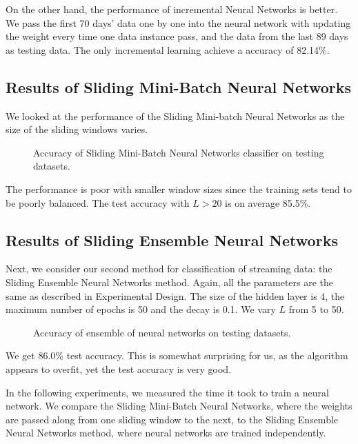 \documentclass[conference]{IEEEtran}
\begin{document}
		On the other hand, the performance of incremental Neural Networks is better. We pass the first 70 days' data one by one into the neural network with updating the weight every time one data instance pass, and the data from the last 89 days as testing data. The only incremental learning achieve a accuracy of 82.14\%.
		
		\subsection{Results of Sliding Mini-Batch Neural Networks}
		
		We looked at the performance of the Sliding Mini-batch Neural Networks as the size of the sliding windows varies.
		\begin{figure}[H]
			\centering
			\caption{Accuracy of Sliding Mini-Batch Neural Networks classifier on testing datasets.}
			\label{fig:benchmark}
		\end{figure}
		The performance is poor with smaller window sizes since the training sets tend to be poorly balanced. The test accuracy with $L > 20$ is on average 85.5\%.
		
		
		\subsection{Results of Sliding Ensemble Neural Networks}
		
		Next, we consider our second method for classification of streaming data: the Sliding Ensemble Neural Networks method.
		Again, all the parameters are the same as described in Experimental Design. The size of the hidden layer is 4, the maximum number of epochs is 50 and the decay is 0.1. We vary $L$ from 5 to 50.
		
		\begin{figure}[H]
			\centering
			\caption{Accuracy of ensemble of neural networks on  testing datasets.}
			\label{fig:results-nnet-ensemble}
		\end{figure}
		
		We get 86.0\% test accuracy. This is somewhat surprising for us, as the algorithm appears to overfit, yet the test accuracy is very good.
		
		In the following experiments, we measured the time it took to train a neural network. We compare the Sliding Mini-Batch Neural Networks, where the weights are passed along from one sliding window to the next, to the Sliding Ensemble Neural Networks method, where neural networks are trained independently.
		
\end{document}
